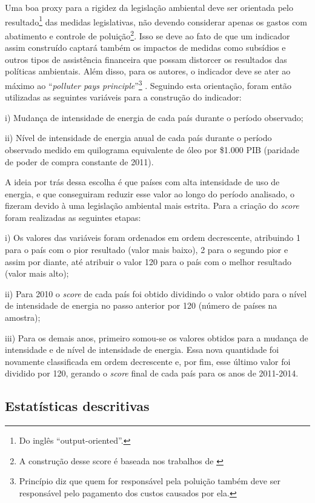 Uma boa proxy para a rigidez da legislação ambiental deve ser orientada pelo resultado\footnote{Do inglês “output-oriented”.}  das medidas legislativas, não devendo considerar apenas os gastos com abatimento e controle de poluição\footnote{A construção desse score é baseada nos trabalhos de \cite{VanBeers1997, Tobey1990}}. Isso se deve ao fato de que um indicador assim construído captará também os impactos de medidas como subsídios e outros tipos de assistência financeira que possam distorcer os resultados das políticas ambientais. Além disso, para os autores, o indicador deve se ater ao máximo ao “\textit{polluter pays principle}”\footnote{Princípio diz que quem for responsável pela poluição também deve ser responsável pelo pagamento dos custos causados por ela.} . Seguindo esta orientação, foram então utilizadas as seguintes variáveis para a construção do indicador:

i) Mudança de intensidade de energia de cada país durante o período observado;

ii) Nível de intensidade de energia anual de cada país durante o período observado medido em quilograma equivalente de óleo por \$1.000 PIB (paridade de poder de compra constante de 2011).

A ideia por trás dessa escolha é que países com alta intensidade de uso de energia, e que conseguiram reduzir esse valor ao longo do período analisado, o fizeram devido à uma legislação ambiental mais estrita. Para a criação do \textit{score} foram realizadas as seguintes etapas:

i) Os valores das variáveis foram ordenados em ordem decrescente, atribuindo 1 para o país com o pior resultado (valor mais baixo), 2 para o segundo pior e assim por diante, até atribuir o valor 120 para o país com o melhor resultado (valor mais alto);

ii) Para 2010 o \textit{score} de cada país foi obtido dividindo o valor obtido para o nível de intensidade de energia no passo anterior por 120 (número de países na amostra); 

iii) Para os demais anos, primeiro somou-se os valores obtidos para a mudança de intensidade e de nível de intensidade de energia. Essa nova quantidade foi novamente classificada em ordem decrescente e, por fim, esse último valor foi dividido por 120, gerando o \textit{score} final de cada país para os anos de 2011-2014.

\subsection{Estatísticas descritivas}

